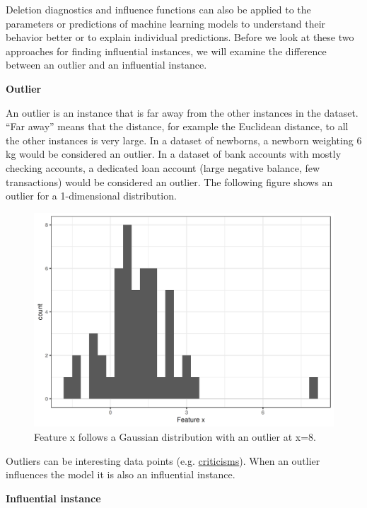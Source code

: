 \documentclass[12pt,]{krantz}
\begin{document}
Deletion diagnostics and influence functions can also be applied to the
parameters or predictions of machine learning models to understand their
behavior better or to explain individual predictions. Before we look at
these two approaches for finding influential instances, we will examine
the difference between an outlier and an influential instance.

\textbf{Outlier}

An outlier is an instance that is far away from the other instances in
the dataset. ``Far away'' means that the distance, for example the
Euclidean distance, to all the other instances is very large. In a
dataset of newborns, a newborn weighting 6 kg would be considered an
outlier. In a dataset of bank accounts with mostly checking accounts, a
dedicated loan account (large negative balance, few transactions) would
be considered an outlier. The following figure shows an outlier for a
1-dimensional distribution.

\begin{figure}

{\centering \includegraphics[width=\textwidth]{images/outlier-1} 

}

\caption{Feature x follows a Gaussian distribution with an outlier at x=8.}\label{fig:outlier}
\end{figure}

Outliers can be interesting data points (e.g.
\protect\hyperlink{proto}{criticisms}). When an outlier influences the
model it is also an influential instance.

\textbf{Influential instance}
\end{document}
